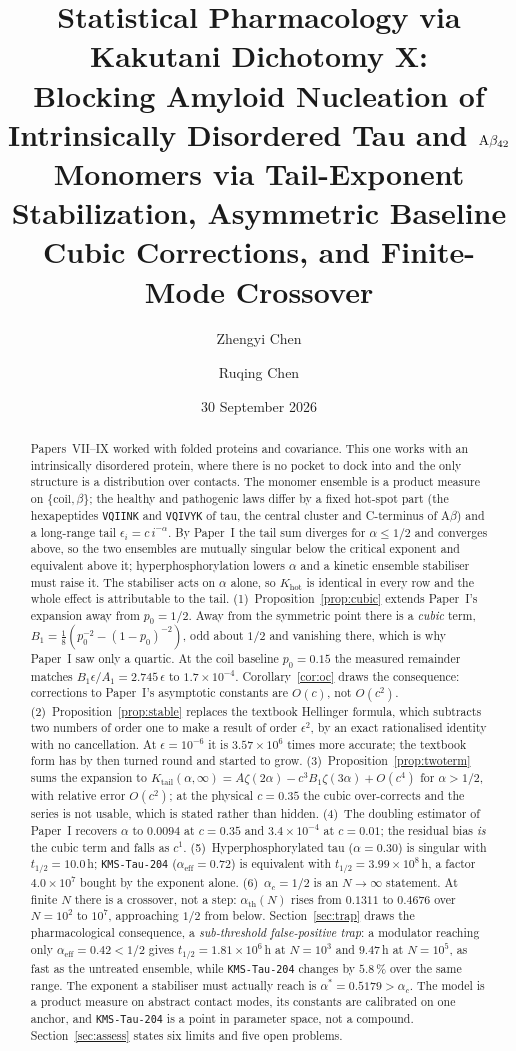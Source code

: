 \documentclass[11pt,reqno]{amsart}
\title[Statistical pharmacology via Kakutani dichotomy X]{Statistical Pharmacology via Kakutani Dichotomy X:\\ Blocking Amyloid Nucleation of Intrinsically Disordered Tau and $\Ab_{42}$ Monomers via Tail-Exponent Stabilization, Asymmetric Baseline Cubic Corrections, and Finite-Mode Crossover}
\author[Z. Chen]{Zhengyi Chen}
\author[R. Chen]{Ruqing Chen}
\date{30 September 2026}
\theoremstyle{plain}
\theoremstyle{definition}
\theoremstyle{remark}
\numberwithin{equation}{section}
\newcommand{\Ab}{\mathrm{A}\beta}
\newcommand{\Kt}{K_{\mathrm{tail}}}
\newcommand{\Khot}{K_{\mathrm{hot}}}
\newcommand{\ac}{\alpha_c}
\newcommand{\aeff}{\alpha_{\mathrm{eff}}}
\newcommand{\ath}{\alpha_{\mathrm{th}}}
\newcommand{\lead}{\texttt{KMS-Tau-204}}
\begin{document}
\begin{abstract}
Papers~VII--IX worked with folded proteins and covariance. This one works with an intrinsically disordered protein, where there is no pocket to dock into and the only structure is a distribution over contacts. The monomer ensemble is a product measure on $\{\text{coil},\beta\}$; the healthy and pathogenic laws differ by a fixed hot-spot part (the hexapeptides \texttt{VQIINK} and \texttt{VQIVYK} of tau, the central cluster and C-terminus of $\Ab$) and a long-range tail $\epsilon_i = c\,i^{-\alpha}$. By Paper~I the tail sum diverges for $\alpha\le1/2$ and converges above, so the two ensembles are mutually singular below the critical exponent and equivalent above it; hyperphosphorylation lowers $\alpha$ and a kinetic ensemble stabiliser must raise it. The stabiliser acts on $\alpha$ alone, so $\Khot$ is identical in every row and the whole effect is attributable to the tail.
(1)~Proposition~\ref{prop:cubic} extends Paper~I's expansion away from $p_0=1/2$. Away from the symmetric point there is a \emph{cubic} term, $B_1=\tfrac18\left(p_0^{-2}-(1-p_0)^{-2}\right)$, odd about $1/2$ and vanishing there, which is why Paper~I saw only a quartic. At the coil baseline $p_0=0.15$ the measured remainder matches $B_1\epsilon/A_1 = 2.745\,\epsilon$ to $1.7\times10^{-4}$. Corollary~\ref{cor:oc} draws the consequence: corrections to Paper~I's asymptotic constants are $O(c)$, not $O(c^2)$.
(2)~Proposition~\ref{prop:stable} replaces the textbook Hellinger formula, which subtracts two numbers of order one to make a result of order $\epsilon^2$, by an exact rationalised identity with no cancellation. At $\epsilon=10^{-6}$ it is $3.57\times10^{6}$ times more accurate; the textbook form has by then turned round and started to grow.
(3)~Proposition~\ref{prop:twoterm} sums the expansion to $\Kt(\alpha,\infty)=A\zeta(2\alpha)-c^3B_1\zeta(3\alpha)+O(c^4)$ for $\alpha>1/2$, with relative error $O(c^2)$; at the physical $c=0.35$ the cubic over-corrects and the series is not usable, which is stated rather than hidden.
(4)~The doubling estimator of Paper~I recovers $\alpha$ to $0.0094$ at $c=0.35$ and $3.4\times10^{-4}$ at $c=0.01$; the residual bias \emph{is} the cubic term and falls as $c^1$.
(5)~Hyperphosphorylated tau ($\alpha=0.30$) is singular with $t_{1/2}=10.0$\,h; \lead{} ($\aeff=0.72$) is equivalent with $t_{1/2}=3.99\times10^8$\,h, a factor $4.0\times10^7$ bought by the exponent alone.
(6)~$\ac=1/2$ is an $N\to\infty$ statement. At finite $N$ there is a crossover, not a step: $\ath(N)$ rises from $0.1311$ to $0.4676$ over $N=10^2$ to $10^7$, approaching $1/2$ from below. Section~\ref{sec:trap} draws the pharmacological consequence, a \emph{sub-threshold false-positive trap}: a modulator reaching only $\aeff=0.42<1/2$ gives $t_{1/2}=1.81\times10^6$\,h at $N=10^3$ and $9.47$\,h at $N=10^5$, as fast as the untreated ensemble, while \lead{} changes by $5.8\,\%$ over the same range. The exponent a stabiliser must actually reach is $\alpha^\ast=0.5179>\ac$.
The model is a product measure on abstract contact modes, its constants are calibrated on one anchor, and \lead{} is a point in parameter space, not a compound. Section~\ref{sec:assess} states six limits and five open problems.
\end{abstract}
\end{document}
